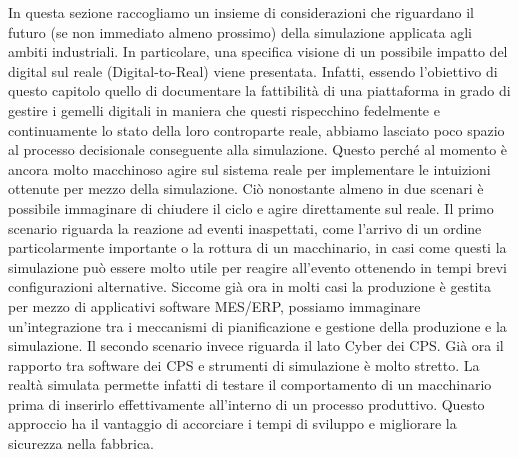 In questa sezione raccogliamo un insieme di considerazioni che riguardano il futuro (se non immediato almeno prossimo) della simulazione applicata agli ambiti industriali. 
In particolare, una specifica visione di un possibile impatto del digital sul reale (Digital-to-Real) viene presentata. Infatti, essendo l'obiettivo di questo capitolo quello di documentare la fattibilità di una piattaforma in grado di gestire i gemelli digitali in maniera che questi rispecchino fedelmente e continuamente lo stato della loro controparte reale, abbiamo lasciato poco spazio al processo decisionale conseguente alla simulazione. Questo perché al momento è ancora molto macchinoso agire sul sistema reale per implementare le intuizioni ottenute per mezzo della simulazione. 
Ciò nonostante almeno in due scenari è possibile immaginare di chiudere il ciclo e agire direttamente sul reale. 
Il primo scenario riguarda la reazione ad eventi inaspettati, come l'arrivo di un ordine particolarmente importante o la rottura di un macchinario, in casi come questi la simulazione può essere molto utile per reagire all'evento ottenendo in tempi brevi configurazioni alternative. Siccome già ora in molti casi la produzione è gestita per mezzo di applicativi software MES/ERP, possiamo immaginare un'integrazione tra i meccanismi di pianificazione e gestione della produzione e la simulazione.
Il secondo scenario invece riguarda il lato Cyber dei CPS. Già ora il rapporto tra software dei CPS e strumenti di simulazione è molto stretto. La realtà simulata permette infatti di testare il comportamento di un macchinario prima di inserirlo effettivamente all'interno di un processo produttivo. Questo approccio ha il vantaggio di accorciare i tempi di sviluppo e migliorare la sicurezza nella fabbrica.  